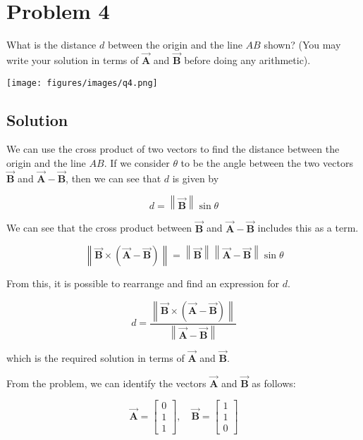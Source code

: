 \section*{Problem 4}

What is the distance \( d \) between the origin and the line \( AB \) shown?
(You may write your solution in terms of \( \vec{\mathbf{A}} \) and \( \vec{\mathbf{B}} \) before doing any arithmetic).

\begin{figure*}[h]
    \centering
    \texttt{[image: figures/images/q4.png]}
\end{figure*}

\subsection*{Solution}

We can use the cross product of two vectors to find the distance between the origin and the line \( AB \).
If we consider \( \theta \) to be the angle between the two vectors \( \vec{\mathbf{B}} \) and \( \vec{\mathbf{A}} - \vec{\mathbf{B}} \), then we can see that \( d \) is given by

\[
    d = \left\lVert \vec{\mathbf{B}} \right\rVert \sin{\theta}
\]

We can see that the cross product between \( \vec{\mathbf{B}} \) and \( \vec{\mathbf{A}} - \vec{\mathbf{B}} \) includes this as a term.

\[
    \left\lVert \vec{\mathbf{B}} \times (\vec{\mathbf{A}} - \vec{\mathbf{B}}) \right\rVert = \left\lVert \vec{\mathbf{B}} \right\rVert \left\lVert \vec{\mathbf{A}} - \vec{\mathbf{B}} \right\rVert \sin{\theta}
\]

From this, it is possible to rearrange and find an expression for \( d \).

\[
    \boxed{
        d = \frac{\left\lVert \vec{\mathbf{B}} \times (\vec{\mathbf{A}} - \vec{\mathbf{B}}) \right\rVert}{\left\lVert \vec{\mathbf{A}} - \vec{\mathbf{B}} \right\rVert}
    }
\]

which is the required solution in terms of \( \vec{\mathbf{A}} \) and \( \vec{\mathbf{B}} \).

From the problem, we can identify the vectors \( \vec{\mathbf{A}} \) and \( \vec{\mathbf{B}} \) as follows:

\[
    \vec{\mathbf{A}} = \begin{bmatrix} 0 \\ 1 \\ 1 \end{bmatrix}, \quad \vec{\mathbf{B}} = \begin{bmatrix} 1 \\ 1 \\ 0 \end{bmatrix}
\]

